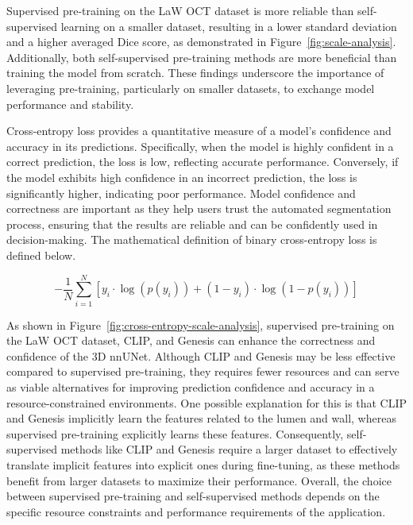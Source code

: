 \documentclass[a4paper,11pt,oneside]{report}
\begin{document}
Supervised pre-training on the LaW OCT dataset is more reliable than self-supervised learning on a smaller dataset, resulting in a lower standard deviation and a higher averaged Dice score, as demonstrated in Figure~\ref{fig:scale-analysis}. Additionally, both self-supervised pre-training methods are more beneficial than training the model from scratch. These findings underscore the importance of leveraging pre-training, particularly on smaller datasets, to exchange model performance and stability.

Cross-entropy loss provides a quantitative measure of a model's confidence and accuracy in its predictions. Specifically, when the model is highly confident in a correct prediction, the loss is low, reflecting accurate performance. Conversely, if the model exhibits high confidence in an incorrect prediction, the loss is significantly higher, indicating poor performance. Model confidence and correctness are important as they help users trust the automated segmentation process, ensuring that the results are reliable and can be confidently used in decision-making. The mathematical definition of binary cross-entropy loss is defined below.

\begin{equation}
-\frac{1}{N}\sum_{i=1}^{N}\left[y_{i}\cdot\log\left(p(y_{i})\right)+ \left( 1-y_{i} \right)\cdot \log\left(1 - p(y_{i})\right) \right]
\end{equation}

As shown in Figure~\ref{fig:cross-entropy-scale-analysis}, supervised pre-training on the LaW OCT dataset, CLIP, and Genesis can enhance the correctness and confidence of the 3D nnUNet. Although CLIP and Genesis may be less effective compared to supervised pre-training, they requires fewer resources and can serve as viable alternatives for improving prediction confidence and accuracy in a resource-constrained environments.
One possible explanation for this is that CLIP and Genesis implicitly learn the features related to the lumen and wall, whereas supervised pre-training explicitly learns these features. Consequently, self-supervised methods like CLIP and Genesis require a larger dataset to effectively translate implicit features into explicit ones during fine-tuning, as these methods benefit from larger datasets to maximize their performance. Overall, the choice between supervised pre-training and self-supervised methods depends on the specific resource constraints and performance requirements of the application.
\end{document}
